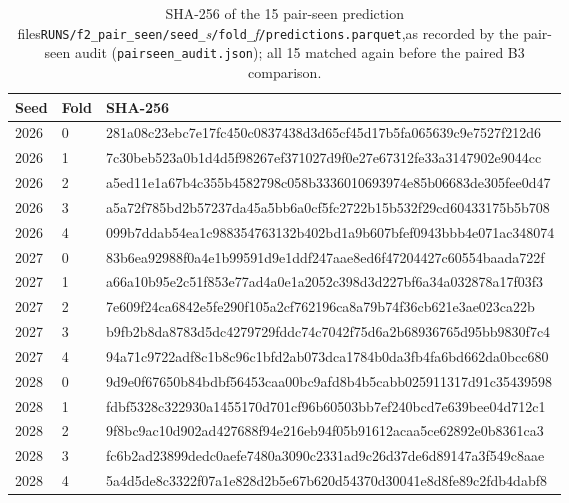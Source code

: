 \documentclass[11pt]{article}
\begin{document}
\begin{table}[htbp]
\caption{SHA-256 of the 15 pair-seen prediction files\newline\texttt{RUNS/f2\_pair\_seen/seed\_}\textit{s}\texttt{/fold\_}\textit{f}\texttt{/predictions.parquet},\newline as recorded by the pair-seen audit (\texttt{pairseen\_audit.json}); all 15 matched again before the paired B3 comparison.}\label{tab:S15}
\centering\small
\begin{tabular}{@{}l l >{\ttfamily}l@{}}
\toprule
Seed & Fold & \normalfont SHA-256 \\
\midrule
2026 & 0 & 281a08c23ebc7e17fc450c0837438d3d65cf45d17b5fa065639c9e7527f212d6 \\
2026 & 1 & 7c30beb523a0b1d4d5f98267ef371027d9f0e27e67312fe33a3147902e9044cc \\
2026 & 2 & a5ed11e1a67b4c355b4582798c058b3336010693974e85b06683de305fee0d47 \\
2026 & 3 & a5a72f785bd2b57237da45a5bb6a0cf5fc2722b15b532f29cd60433175b5b708 \\
2026 & 4 & 099b7ddab54ea1c988354763132b402bd1a9b607bfef0943bbb4e071ac348074 \\
2027 & 0 & 83b6ea92988f0a4e1b99591d9e1ddf247aae8ed6f47204427c60554baada722f \\
2027 & 1 & a66a10b95e2c51f853e77ad4a0e1a2052c398d3d227bf6a34a032878a17f03f3 \\
2027 & 2 & 7e609f24ca6842e5fe290f105a2cf762196ca8a79b74f36cb621e3ae023ca22b \\
2027 & 3 & b9fb2b8da8783d5dc4279729fddc74c7042f75d6a2b68936765d95bb9830f7c4 \\
2027 & 4 & 94a71c9722adf8c1b8c96c1bfd2ab073dca1784b0da3fb4fa6bd662da0bcc680 \\
2028 & 0 & 9d9e0f67650b84bdbf56453caa00bc9afd8b4b5cabb025911317d91c35439598 \\
2028 & 1 & fdbf5328c322930a1455170d701cf96b60503bb7ef240bcd7e639bee04d712c1 \\
2028 & 2 & 9f8bc9ac10d902ad427688f94e216eb94f05b91612acaa5ce62892e0b8361ca3 \\
2028 & 3 & fc6b2ad23899dedc0aefe7480a3090c2331ad9c26d37de6d89147a3f549c8aae \\
2028 & 4 & 5a4d5de8c3322f07a1e828d2b5e67b620d54370d30041e8d8fe89c2fdb4dabf8 \\
\bottomrule
\end{tabular}
\end{table}
\end{document}
